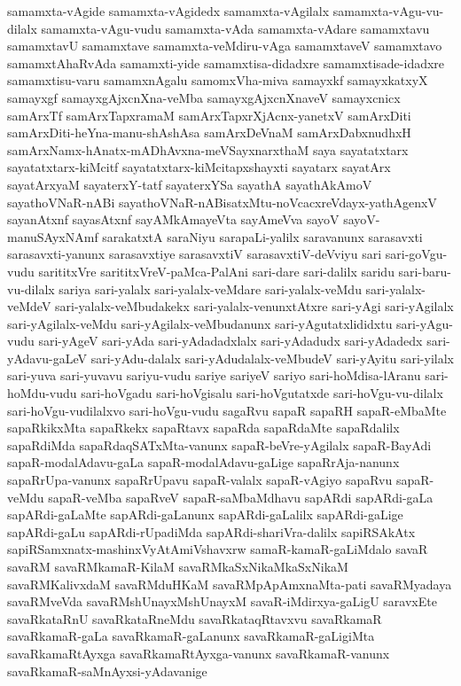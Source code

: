 {samamxta-vAgide
samamxta-vAgidedx
samamxta-vAgilalx
samamxta-vAgu-vu-dilalx
samamxta-vAgu-vudu
samamxta-vAda
samamxta-vAdare
samamxtavu
samamxtavU
samamxtave
samamxta-veMdiru-vAga
samamxtaveV
samamxtavo
samamxtAhaRvAda
samamxti-yide
samamxtisa-didadxre
samamxtisade-idadxre
samamxtisu-varu
samamxnAgalu
samomxVha-miva
samayxkf
samayxkatxyX
samayxgf
samayxgAjxcnXna-veMba
samayxgAjxcnXnaveV
samayxcnicx
samArxTf
samArxTapxramaM
samArxTapxrXjAcnx-yanetxV
samArxDiti
samArxDiti-heYna-manu-shAshAsa
samArxDeVnaM
samArxDabxnudhxH
samArxNamx-hAnatx-mADhAvxna-meVSayxnarxthaM
saya
sayatatxtarx
sayatatxtarx-kiMcitf
sayatatxtarx-kiMcitapxshayxti
sayatarx
sayatArx
sayatArxyaM
sayaterxY-tatf
sayaterxYSa
sayathA
sayathAkAmoV
sayathoVNaR-nABi
sayathoVNaR-nABisatxMtu-noVcacxreVdayx-yathAgenxV
sayanAtxnf
sayasAtxnf
sayAMkAmayeVta
sayAmeVva
sayoV
sayoV-manuSAyxNAmf
sarakatxtA
saraNiyu
sarapaLi-yalilx
saravanunx
sarasavxti
sarasavxti-yanunx
sarasavxtiye
sarasavxtiV
sarasavxtiV-deVviyu
sari
sari-goVgu-vudu
sarititxVre
sarititxVreV-paMca-PalAni
sari-dare
sari-dalilx
saridu
sari-baru-vu-dilalx
sariya
sari-yalalx
sari-yalalx-veMdare
sari-yalalx-veMdu
sari-yalalx-veMdeV
sari-yalalx-veMbudakekx
sari-yalalx-venunxtAtxre
sari-yAgi
sari-yAgilalx
sari-yAgilalx-veMdu
sari-yAgilalx-veMbudanunx
sari-yAgutatxlididxtu
sari-yAgu-vudu
sari-yAgeV
sari-yAda
sari-yAdadadxlalx
sari-yAdadudx
sari-yAdadedx
sari-yAdavu-gaLeV
sari-yAdu-dalalx
sari-yAdudalalx-veMbudeV
sari-yAyitu
sari-yilalx
sari-yuva
sari-yuvavu
sariyu-vudu
sariye
sariyeV
sariyo
sari-hoMdisa-lAranu
sari-hoMdu-vudu
sari-hoVgadu
sari-hoVgisalu
sari-hoVgutatxde
sari-hoVgu-vu-dilalx
sari-hoVgu-vudilalxvo
sari-hoVgu-vudu
sagaRvu
sapaR
sapaRH
sapaR-eMbaMte
sapaRkikxMta
sapaRkekx
sapaRtavx
sapaRda
sapaRdaMte
sapaRdalilx
sapaRdiMda
sapaRdaqSATxMta-vanunx
sapaR-beVre-yAgilalx
sapaR-BayAdi
sapaR-modalAdavu-gaLa
sapaR-modalAdavu-gaLige
sapaRrAja-nanunx
sapaRrUpa-vanunx
sapaRrUpavu
sapaR-valalx
sapaR-vAgiyo
sapaRvu
sapaR-veMdu
sapaR-veMba
sapaRveV
sapaR-saMbaMdhavu
sapARdi
sapARdi-gaLa
sapARdi-gaLaMte
sapARdi-gaLanunx
sapARdi-gaLalilx
sapARdi-gaLige
sapARdi-gaLu
sapARdi-rUpadiMda
sapARdi-shariVra-dalilx
sapiRSAkAtx
sapiRSamxnatx-mashinxVyAtAmiVshavxrw
samaR-kamaR-gaLiMdalo
savaR
savaRM
savaRMkamaR-KilaM
savaRMkaSxNikaMkaSxNikaM
savaRMKalivxdaM
savaRMduHKaM
savaRMpApAmxnaMta-pati
savaRMyadaya
savaRMveVda
savaRMshUnayxMshUnayxM
savaR-iMdirxya-gaLigU
saravxEte
savaRkataRnU
savaRkataRneMdu
savaRkataqRtavxvu
savaRkamaR
savaRkamaR-gaLa
savaRkamaR-gaLanunx
savaRkamaR-gaLigiMta
savaRkamaRtAyxga
savaRkamaRtAyxga-vanunx
savaRkamaR-vanunx
savaRkamaR-saMnAyxsi-yAdavanige
}

